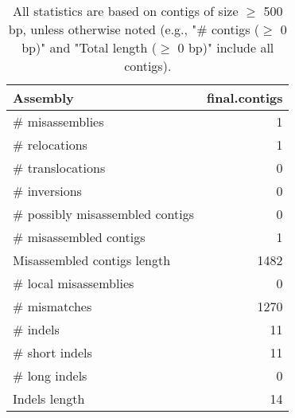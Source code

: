 \documentclass[12pt,a4paper]{article}
\begin{document}
\begin{table}[ht]
\begin{center}
\caption{All statistics are based on contigs of size $\geq$ 500 bp, unless otherwise noted (e.g., "\# contigs ($\geq$ 0 bp)" and "Total length ($\geq$ 0 bp)" include all contigs).}
\begin{tabular}{|l*{1}{|r}|}
\hline
Assembly & final.contigs \\ \hline
\# misassemblies & 1 \\ \hline
\hspace{5mm}\# relocations & 1 \\ \hline
\hspace{5mm}\# translocations & 0 \\ \hline
\hspace{5mm}\# inversions & 0 \\ \hline
\# possibly misassembled contigs & 0 \\ \hline
\# misassembled contigs & 1 \\ \hline
Misassembled contigs length & 1482 \\ \hline
\# local misassemblies & 0 \\ \hline
\# mismatches & 1270 \\ \hline
\# indels & 11 \\ \hline
\hspace{5mm}\# short indels & 11 \\ \hline
\hspace{5mm}\# long indels & 0 \\ \hline
Indels length & 14 \\ \hline
\end{tabular}
\end{center}
\end{table}
\end{document}
